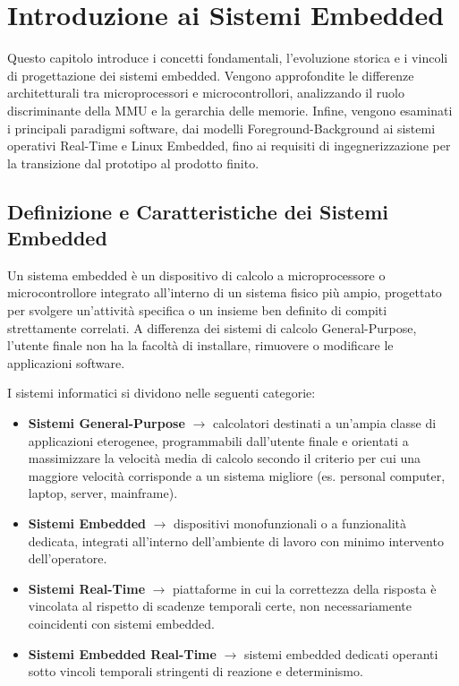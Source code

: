 \chapter{Introduzione ai Sistemi Embedded}
Questo capitolo introduce i concetti fondamentali, l'evoluzione storica e i vincoli di progettazione dei sistemi embedded. Vengono approfondite le differenze architetturali tra microprocessori e microcontrollori, analizzando il ruolo discriminante della MMU e la gerarchia delle memorie. Infine, vengono esaminati i principali paradigmi software, dai modelli Foreground-Background ai sistemi operativi Real-Time e Linux Embedded, fino ai requisiti di ingegnerizzazione per la transizione dal prototipo al prodotto finito.

\section{Definizione e Caratteristiche dei Sistemi Embedded}
Un sistema embedded è un dispositivo di calcolo a microprocessore o microcontrollore integrato all'interno di un sistema fisico più ampio, progettato per svolgere un'attività specifica o un insieme ben definito di compiti strettamente correlati. A differenza dei sistemi di calcolo General-Purpose, l'utente finale non ha la facoltà di installare, rimuovere o modificare le applicazioni software.

I sistemi informatici si dividono nelle seguenti categorie:
\begin{itemize}
    \item \textbf{Sistemi General-Purpose} $\rightarrow$ calcolatori destinati a un'ampia classe di applicazioni eterogenee, programmabili dall'utente finale e orientati a massimizzare la velocità media di calcolo secondo il criterio per cui una maggiore velocità corrisponde a un sistema migliore (es. personal computer, laptop, server, mainframe).
    \item \textbf{Sistemi Embedded} $\rightarrow$ dispositivi monofunzionali o a funzionalità dedicata, integrati all'interno dell'ambiente di lavoro con minimo intervento dell'operatore.
    \item \textbf{Sistemi Real-Time} $\rightarrow$ piattaforme in cui la correttezza della risposta è vincolata al rispetto di scadenze temporali certe, non necessariamente coincidenti con sistemi embedded.
    \item \textbf{Sistemi Embedded Real-Time} $\rightarrow$ sistemi embedded dedicati operanti sotto vincoli temporali stringenti di reazione e determinismo.
\end{itemize}

